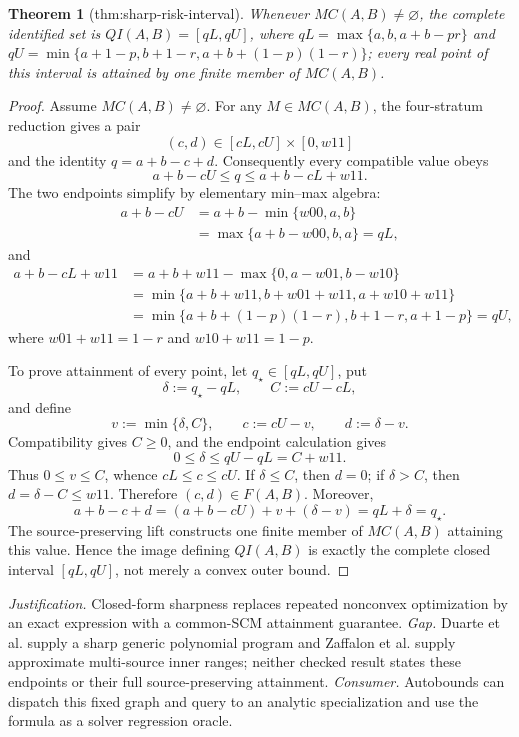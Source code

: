 \documentclass{article}
\newtheorem{theorem}{Theorem}
\begin{document}
\begin{theorem}[thm:sharp-risk-interval]\label{thm:sharp-risk-interval}
Whenever \(MC(A,B)\neq\varnothing\), the complete identified set is \(QI(A,B)=[qL,qU]\), where \(qL=\max\{a,b,a+b-pr\}\) and \(qU=\min\{a+1-p,b+1-r,a+b+(1-p)(1-r)\}\); every real point of this interval is attained by one finite member of \(MC(A,B)\).
\end{theorem}
\begin{proof}
Assume \(MC(A,B)\neq\varnothing\).  For any \(M\in MC(A,B)\), the four-stratum reduction gives a pair
\[
(c,d)\in[cL,cU]\times[0,w11]
\]
and the identity \(q=a+b-c+d\).  Consequently every compatible value obeys
\[
a+b-cU\le q\le a+b-cL+w11.
\]
The two endpoints simplify by elementary min--max algebra:
\[
\begin{aligned}
a+b-cU
&=a+b-\min\{w00,a,b\}\\
&=\max\{a+b-w00,b,a\}=qL,
\end{aligned}
\]
and
\[
\begin{aligned}
a+b-cL+w11
&=a+b+w11-\max\{0,a-w01,b-w10\}\\
&=\min\{a+b+w11,b+w01+w11,a+w10+w11\}\\
&=\min\{a+b+(1-p)(1-r),b+1-r,a+1-p\}=qU,
\end{aligned}
\]
where \(w01+w11=1-r\) and \(w10+w11=1-p\).

To prove attainment of every point, let \(q_\star\in[qL,qU]\), put
\[
\delta:=q_\star-qL,\qquad C:=cU-cL,
\]
and define
\[
v:=\min\{\delta,C\},\qquad c:=cU-v,\qquad d:=\delta-v.
\]
Compatibility gives \(C\ge0\), and the endpoint calculation gives
\[
0\le\delta\le qU-qL=C+w11.
\]
Thus \(0\le v\le C\), whence \(cL\le c\le cU\).  If \(\delta\le C\), then \(d=0\); if \(\delta>C\), then \(d=\delta-C\le w11\).  Therefore \((c,d)\in F(A,B)\).  Moreover,
\[
a+b-c+d=(a+b-cU)+v+(\delta-v)=qL+\delta=q_\star.
\]
The source-preserving lift constructs one finite member of \(MC(A,B)\) attaining this value.  Hence the image defining \(QI(A,B)\) is exactly the complete closed interval \([qL,qU]\), not merely a convex outer bound.
\end{proof}
\par\smallskip\noindent \textit{Justification.} Closed-form sharpness replaces repeated nonconvex optimization by an exact expression with a common-SCM attainment guarantee. \textit{Gap.} Duarte et al. supply a sharp generic polynomial program and Zaffalon et al. supply approximate multi-source inner ranges; neither checked result states these endpoints or their full source-preserving attainment. \textit{Consumer.} Autobounds can dispatch this fixed graph and query to an analytic specialization and use the formula as a solver regression oracle.
\end{document}
